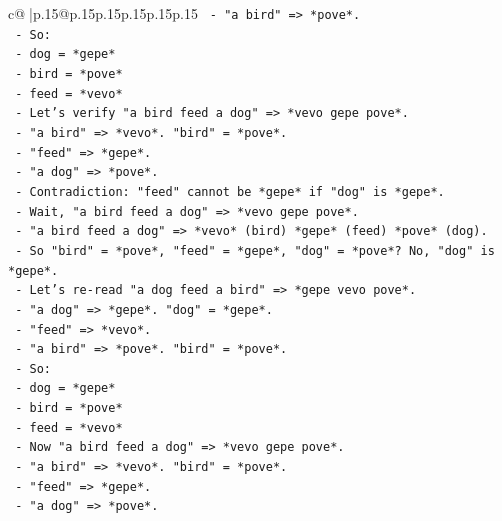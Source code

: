 \documentclass{article}
\begin{document}
{\begin{supertabular}{c@{$\;$}|p{.15\linewidth}@{}p{.15\linewidth}p{.15\linewidth}p{.15\linewidth}p{.15\linewidth}p{.15\linewidth}}
{{{\texttt{            {-}   "a bird" => *pove*.} \\
\texttt{            {-}   So:} \\
\texttt{                {-}   dog = *gepe*} \\
\texttt{                {-}   bird = *pove*} \\
\texttt{                {-}   feed = *vevo*} \\
\texttt{            {-}   Let's verify "a bird feed a dog" => *vevo gepe pove*.} \\
\texttt{                {-}   "a bird" => *vevo*. "bird" = *pove*.} \\
\texttt{                {-}   "feed" => *gepe*.} \\
\texttt{                {-}   "a dog" => *pove*.} \\
\texttt{                {-}   Contradiction: "feed" cannot be *gepe* if "dog" is *gepe*.} \\
\texttt{                {-}   Wait, "a bird feed a dog" => *vevo gepe pove*.} \\
\texttt{                {-}   "a bird feed a dog" => *vevo* (bird) *gepe* (feed) *pove* (dog).} \\
\texttt{                {-}   So "bird" = *pove*, "feed" = *gepe*, "dog" = *pove*? No, "dog" is *gepe*.} \\
\texttt{                {-}   Let's re{-}read "a dog feed a bird" => *gepe vevo pove*.} \\
\texttt{                    {-}   "a dog" => *gepe*. "dog" = *gepe*.} \\
\texttt{                    {-}   "feed" => *vevo*.} \\
\texttt{                    {-}   "a bird" => *pove*. "bird" = *pove*.} \\
\texttt{                {-}   So:} \\
\texttt{                    {-}   dog = *gepe*} \\
\texttt{                    {-}   bird = *pove*} \\
\texttt{                    {-}   feed = *vevo*} \\
\texttt{                {-}   Now "a bird feed a dog" => *vevo gepe pove*.} \\
\texttt{                    {-}   "a bird" => *vevo*. "bird" = *pove*.} \\
\texttt{                    {-}   "feed" => *gepe*.} \\
\texttt{                    {-}   "a dog" => *pove*.} \\
}}}
\end{supertabular}}
\end{document}
